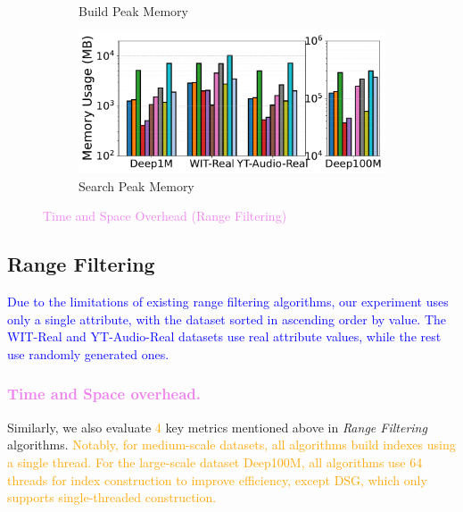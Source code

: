 \documentclass[sigconf, nonacm]{acmart}
\begin{document}
{\begin{figure}[t]
\begin{subfigure}[t]{0.495\columnwidth}
			\caption{\footnotesize Build Peak Memory}
			\label{fig:rangeFilter_build_memory_mb}
		\end{subfigure}
		\hfill
		\begin{subfigure}[t]{0.495\columnwidth}
			\centering
			\includegraphics[width=\linewidth]{figures/searchMem/range_memory_comparison.pdf}
			\caption{\footnotesize Search Peak Memory}
			\label{fig:rangeFilter_search_memory_mb}
		\end{subfigure}
		
		\caption{\textcolor{violet}{Time and Space Overhead (Range Filtering)}}
		\label{fig:rangeFilter_build_index_comparison}
	\end{figure}
	\subsection{Range Filtering}
	\textcolor{blue}{Due to the limitations of existing range filtering algorithms, our experiment uses only a single attribute, with the dataset sorted in ascending order by value. The WIT-Real and YT-Audio-Real datasets use real attribute values, while the rest use randomly generated ones. }
	\subsubsection{\textcolor{violet}{Time and Space overhead.}}
	
	Similarly, we also evaluate \textcolor{orange}{4} key metrics mentioned above in \textit{Range Filtering} algorithms. \textcolor{orange}{Notably, for medium-scale datasets, all algorithms build indexes using a single thread. For the large-scale dataset Deep100M, all algorithms use 64 threads for index construction to improve efficiency, except DSG, which only supports single-threaded construction.}
	
}
\end{document}
